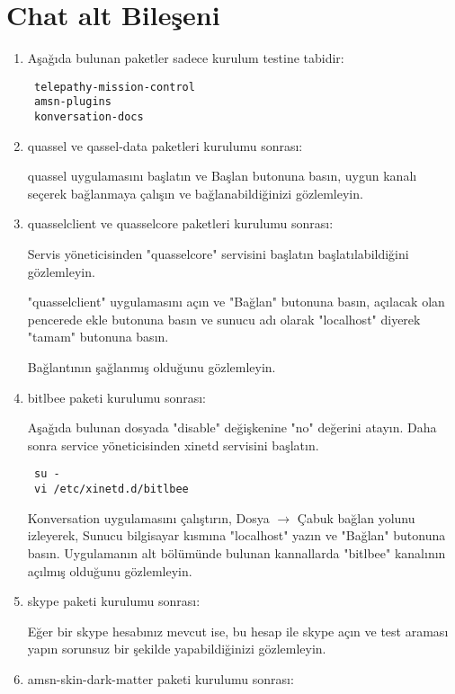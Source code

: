 \documentclass[a4paper,10pt]{article}
\begin{document}
\section{Chat alt Bileşeni}
\begin{enumerate}

\item Aşağıda bulunan paketler sadece kurulum testine tabidir:

\begin{verbatim}
 telepathy-mission-control
 amsn-plugins
 konversation-docs 
\end{verbatim}

\item quassel ve qassel-data paketleri kurulumu sonrası:

quassel uygulamasını başlatın ve Başlan butonuna basın, uygun kanalı seçerek bağlanmaya çalışın ve bağlanabildiğinizi gözlemleyin.

\item quasselclient ve quasselcore paketleri kurulumu sonrası:

Servis yöneticisinden "quasselcore" servisini başlatın başlatılabildiğini gözlemleyin.

"quasselclient" uygulamasını açın ve "Bağlan" butonuna basın, açılacak olan pencerede ekle butonuna basın ve sunucu adı olarak "localhost" diyerek "tamam" butonuna basın.

Bağlantının şağlanmış olduğunu gözlemleyin.

\item bitlbee paketi kurulumu sonrası:

Aşağıda bulunan dosyada "disable" değişkenine "no" değerini atayın. Daha sonra service yöneticisinden xinetd servisini başlatın. 
\begin{verbatim}
 su -
 vi /etc/xinetd.d/bitlbee
\end{verbatim}

Konversation uygulamasını çalıştırın, Dosya $\rightarrow$ Çabuk bağlan yolunu izleyerek, Sunucu bilgisayar kısmına "localhost" yazın ve "Bağlan" butonuna basın. Uygulamanın alt bölümünde bulunan kannallarda "bitlbee" kanalının açılmış olduğunu gözlemleyin.

\item skype paketi kurulumu sonrası:

Eğer bir skype hesabınız mevcut ise, bu hesap ile skype açın ve test araması yapın sorunsuz bir şekilde yapabildiğinizi gözlemleyin.
\item amsn-skin-dark-matter paketi kurulumu sonrası:


\end{enumerate}
\end{document}
